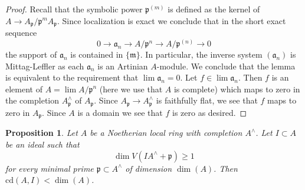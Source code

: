 \documentclass{stacks-project}
\newenvironment{reference}{\comment}{\endcomment}
\theoremstyle{plain}
\newtheorem{proposition}[subsection]{Proposition}
\theoremstyle{definition}
\theoremstyle{remark}
\numberwithin{equation}{subsection}
\def\lim{\mathop{\mathrm{lim}}\nolimits}
\begin{document}
\begin{proof}
Recall that the symbolic power $\mathfrak p^{(m)}$ is defined as the
kernel of $A \to A_\mathfrak p/\mathfrak p^mA_\mathfrak p$.
Since localization is exact we conclude that in the short exact sequence
$$
0 \to \mathfrak a_n \to A/\mathfrak p^n \to A/\mathfrak p^{(n)} \to 0
$$
the support of $\mathfrak a_n$ is contained in $\{\mathfrak m\}$.
In particular, the inverse system $(\mathfrak a_n)$ is Mittag-Leffler
as each $\mathfrak a_n$ is an Artinian $A$-module.
We conclude that the lemma is equivalent to the requirement
that $\lim \mathfrak a_n = 0$. Let $f \in \lim \mathfrak a_n$.
Then $f$ is an element of $A = \lim A/\mathfrak p^n$
(here we use that $A$ is complete)
which maps to zero in the completion $A_\mathfrak p^\wedge$
of $A_\mathfrak p$. Since $A_\mathfrak p \to A_\mathfrak p^\wedge$
is faithfully flat, we see that $f$ maps to zero in $A_\mathfrak p$.
Since $A$ is a domain we see that $f$ is zero as desired.
\end{proof}

\begin{proposition}
\label{proposition-Hartshorne-Lichtenbaum-vanishing}
\begin{reference}
\cite[Theorem 3.1]{CD}
\end{reference}
Let $A$ be a Noetherian local ring with completion $A^\wedge$.
Let $I \subset A$ be an ideal such that
$$
\dim V(IA^\wedge + \mathfrak p) \geq 1
$$
for every minimal prime $\mathfrak p \subset A^\wedge$ of dimension $\dim(A)$.
Then $\text{cd}(A, I) < \dim(A)$.
\end{proposition}
\end{document}
